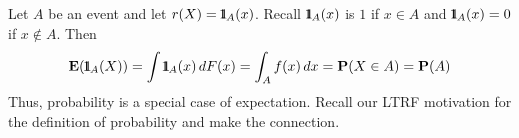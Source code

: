 \begin{example}
Let $A$ be an event and let $r(X)={1}\mspace{-11 mu}{1}_{A}(x)$.  Recall ${1}\mspace{-11 mu}{1}_A(x)$ is $1$ if $x \in A$ and ${1}\mspace{-11 mu}{1}_A(x)=0$ if $x \notin A$.  Then
\begin{equation}\label{E:ExpectationofIndicator}
\mathbf{E}({1}\mspace{-11 mu}{1}_A(X)) = \int {1}\mspace{-11 mu}{1}_A(x)\, dF(x) = \int_A f(x)\, dx = \mathbf{P}(X \in A) = \mathbf{P}(A)
\end{equation}
Thus, probability is a special case of expectation.  Recall our LTRF motivation for the definition of probability and make the connection.
\end{example}

